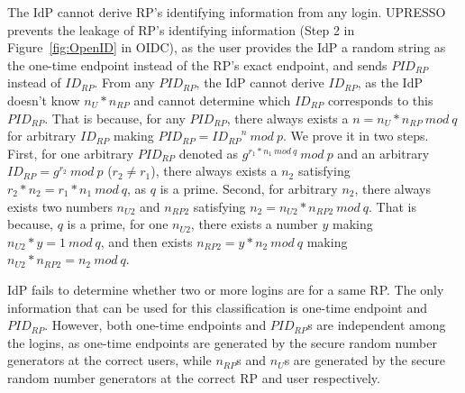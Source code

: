 The IdP cannot derive RP's identifying information from any login.
UPRESSO prevents the leakage of RP's identifying information (Step 2 in Figure~\ref{fig:OpenID} in OIDC), as the user provides the IdP a random string as the one-time endpoint instead of the RP's exact endpoint, and sends $PID_{RP}$ instead of $ID_{RP}$.
From any $PID_{RP}$, the IdP cannot derive $ID_{RP}$, as the IdP doesn't know $n_U*n_{RP}$ and cannot determine which $ID_{RP}$ corresponds to this $PID_{RP}$.
That is because,
for any $PID_{RP}$, there always exists a $n=n_U*n_{RP}\ mod\ q$ for arbitrary $ID_{RP}$ making $PID_{RP}={ID_{RP}}^n \ mod\ p$.
We prove it in two steps.
First, for one arbitrary $PID_{RP}$ denoted  as $g^{r_1*n_1\ mod\ q}\ mod\ p$ and  an arbitrary  $ID_{RP}=g^{r_2}\ mod\ p$ ($r_2 \neq r_1$),  there always exists a $n_2$ satisfying $r_2*n_2=r_1*n_1\ mod\ q$, as $q$ is a prime.
Second, for arbitrary $n_2$, there always exists two numbers $n_{U2}$ and $n_{RP2}$ satisfying $n_2= n_{U2}*n_{RP2}\ mod\ q$. 
That is because, $q$ is a prime, for one $n_{U2}$, there exists a number $y$ making $n_{U2}*y=1\ mod\ q$, and then exists $n_{RP2}= y*n_2\ mod\ q$ making $n_{U2}*n_{RP2}=n_2\ mod\ q$.

   

IdP fails to determine whether two or more logins are for a same RP. The only information that can be used for this classification is one-time endpoint and $PID_{RP}$. However, both one-time endpoints and $PID_{RP}$s are independent among the logins, as one-time endpoints are generated by the secure random number generators at the correct users, while $n_{RP}$s and $n_{U}$s are generated by the secure random number generators at the correct RP and user respectively.


